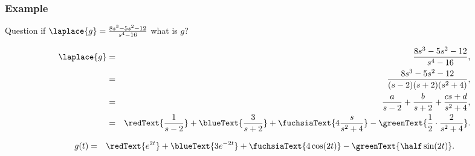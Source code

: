 \begin{frame}
  \frametitle{Example}

  \begin{block}{Question}
    if $\laplace{g}=\frac{8s^3-5s^2-12}{s^4-16}$ what is $g$?
  \end{block}

    {
      \begin{eqnarray*}
        \laplace{g} & = & \frac{8s^3-5s^2-12}{s^4-16}, \\
        & = & \frac{8s^3-5s^2-12}{(s-2)(s+2)(s^2+4)}, \\
        & = & \frac{a}{s-2} + \frac{b}{s+2} + \frac{cs+d}{s^2+4}, \\
        & = & \redText{\frac{1}{s-2}} + \blueText{\frac{3}{s+2}} +
              \fuchsiaText{4 \frac{s}{s^2+4}} - \greenText{\frac{1}{2}\cdot\frac{2}{s^2+4}}.
      \end{eqnarray*}
    }

    {
      \begin{eqnarray*}
        g(t) & = & \redText{e^{2t}} + \blueText{3e^{-2t}} + \fuchsiaText{4\cos(2t)} - \greenText{\half\sin(2t)}.
      \end{eqnarray*}
    }


\end{frame}




